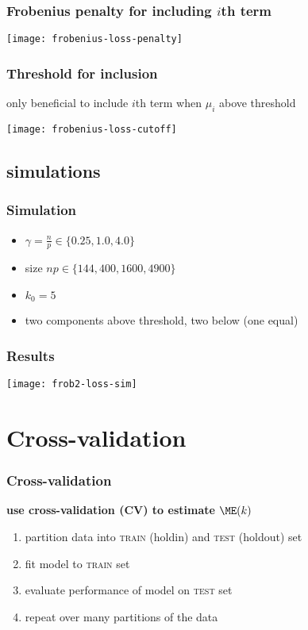 \documentclass[14pt]{beamer}
\begin{document}
\begin{frame}
  \frametitle{Frobenius penalty for including $i$th term}
  \begin{center}
  \texttt{[image: frobenius-loss-penalty]}
  \end{center}
\end{frame}

\begin{frame}
  \frametitle{Threshold for inclusion}
  only beneficial to include $i$th term when $\mu_i$ above threshold
  \begin{center}
  \texttt{[image: frobenius-loss-cutoff]}
  \end{center}
\end{frame}
\subsection{simulations}

\begin{frame}
  \frametitle{Simulation}
  \begin{itemize}
  \item $\gamma = \frac{n}{p} \in \{ 0.25, 1.0, 4.0 \}$
  \item size $n p \in \{ 144, 400, 1600, 4900 \}$
  \item $k_0 = 5$
  \item two components above threshold, two below (one equal)
  \end{itemize}
\end{frame}

\begin{frame}
  \frametitle{Results}
  \begin{center}
  \texttt{[image: frob2-loss-sim]}
  \end{center}
\end{frame}


\section{Cross-validation}

\begin{frame}
  \frametitle{Cross-validation}
  \textbf{use cross-validation (CV) to estimate $\ME(k)$}
  \begin{enumerate}
  \item partition data into \textsc{train} (holdin) and \textsc{test} (holdout) set
  \item fit model to \textsc{train} set   
  \item evaluate performance of model on \textsc{test} set
  \item repeat over many partitions of the data
  \end{enumerate}
\end{frame}
\end{document}
